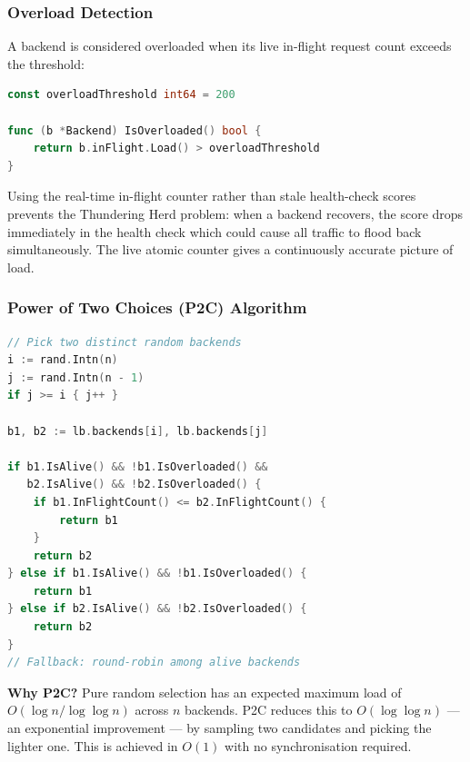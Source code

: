 \documentclass[12pt,a4paper]{article}
\begin{document}
\subsubsection{Overload Detection}

A backend is considered overloaded when its live in-flight request count exceeds the threshold:

\begin{lstlisting}[language=Go, caption={Real-time overload detection using atomic in-flight counter}]
const overloadThreshold int64 = 200

func (b *Backend) IsOverloaded() bool {
    return b.inFlight.Load() > overloadThreshold
}
\end{lstlisting}

Using the real-time in-flight counter rather than stale health-check scores prevents the Thundering Herd problem: when a backend recovers, the score drops immediately in the health check which could cause all traffic to flood back simultaneously. The live atomic counter gives a continuously accurate picture of load.

\subsubsection{Power of Two Choices (P2C) Algorithm}

\begin{lstlisting}[language=Go, caption={P2C backend selection in nextBackend() -- main.go}]
// Pick two distinct random backends
i := rand.Intn(n)
j := rand.Intn(n - 1)
if j >= i { j++ }

b1, b2 := lb.backends[i], lb.backends[j]

if b1.IsAlive() && !b1.IsOverloaded() &&
   b2.IsAlive() && !b2.IsOverloaded() {
    if b1.InFlightCount() <= b2.InFlightCount() {
        return b1
    }
    return b2
} else if b1.IsAlive() && !b1.IsOverloaded() {
    return b1
} else if b2.IsAlive() && !b2.IsOverloaded() {
    return b2
}
// Fallback: round-robin among alive backends
\end{lstlisting}

\begin{infobox}
\textbf{Why P2C?} Pure random selection has an expected maximum load of $O(\log n / \log \log n)$ across $n$ backends. P2C reduces this to $O(\log \log n)$ --- an exponential improvement --- by sampling two candidates and picking the lighter one. This is achieved in $O(1)$ with no synchronisation required.
\end{infobox}
\end{document}

